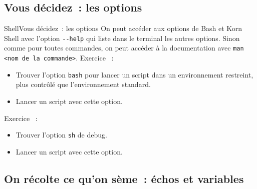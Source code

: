 \documentclass{beamer}
\begin{document}
    \subsection{Vous décidez~: les options}\label{subsec:shell-options}

    \begin{frame}[fragile]{Shell}{Vous décidez~: les options}
        On peut accéder aux options de Bash et Korn Shell avec l'option \lstinline{--help} qui liste dans le terminal les autres options.
        \bigbreak
        Sinon comme pour toutes commandes, on peut accéder à la documentation avec \lstinline{man <nom de la commande>}.
        \bigbreak
        Exercice \execcounterdispinc~:
        \begin{itemize}
            \item Trouver l'option \lstinline{bash} pour lancer un script dans un environnement restreint, plus contrôlé que l'environnement standard.
            \item Lancer un script avec cette option.
        \end{itemize}
        Exercice \execcounterdispinc~:
        \begin{itemize}
            \item Trouver l'option \lstinline{sh} de debug.
            \item Lancer un script avec cette option.
        \end{itemize}
    \end{frame}

    \subsection{On récolte ce qu'on sème~: échos et variables}\label{subsec:recolte}
\end{document}
